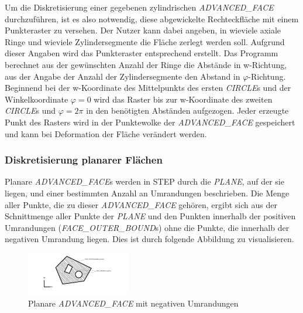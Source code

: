 Um die Diskretisierung einer gegebenen zylindrischen \textit{ADVANCED\_FACE} durchzuführen, ist es also notwendig, diese abgewickelte Rechteckfläche mit einem Punkteraster zu versehen. Der Nutzer kann dabei angeben, in wieviele axiale Ringe und wieviele Zylindersegmente die Fläche zerlegt werden soll. Aufgrund dieser Angaben wird das Punkteraster entsprechend erstellt. Das Programm berechnet aus der gewünschten Anzahl der Ringe die Abstände in w-Richtung, aus der Angabe der Anzahl der Zylindersegmente den Abstand in $\varphi$-Richtung. Beginnend bei der w-Koordinate des Mittelpunkts des ersten \textit{CIRCLE}s und der Winkelkoordinate $\varphi = 0$ wird das Raster bis zur w-Koordinate des zweiten \textit{CIRCLE}s und $\varphi = 2\pi$ in den benötigten Abständen aufgezogen. Jeder erzeugte Punkt des Rasters wird in der Punktewolke der \textit{ADVANCED\_FACE} gespeichert und kann bei Deformation der Fläche verändert werden. 

\subsubsection{Diskretisierung planarer Flächen}
\label{sec:discreteplanar}

Planare \textit{ADVANCED\_FACE}s werden in STEP durch die \textit{PLANE}, auf der sie liegen, und einer bestimmten Anzahl an Umrandungen beschrieben. Die Menge aller Punkte, die zu dieser \textit{ADVANCED\_FACE} gehören, ergibt sich aus der Schnittmenge aller Punkte der \textit{PLANE} und den Punkten innerhalb der positiven Umrandungen (\textit{FACE\_OUTER\_BOUND}s) ohne die Punkte, die innerhalb der negativen Umrandung liegen. 
Dies ist durch folgende Abbildung zu visualisieren.

\begin{figure}[h]
	\centering
	
	\includegraphics[width=\linewidth]{img/posnegbounds.pdf}
	
	\caption{Planare \textit{ADVANCED\_FACE} mit negativen Umrandungen}
	\label{fig:posnegbounds}
	
\end{figure}

